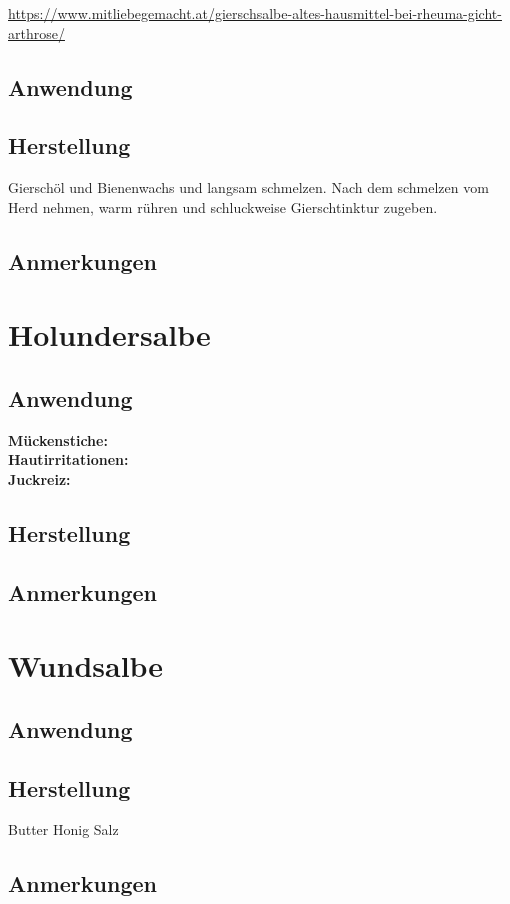 \url{https://www.mitliebegemacht.at/gierschsalbe-altes-hausmittel-bei-rheuma-gicht-arthrose/}

    

\subsection{Anwendung}

\subsection{Herstellung}

Gierschöl und Bienenwachs und langsam schmelzen. Nach dem schmelzen vom Herd nehmen, warm rühren und schluckweise Gierschtinktur zugeben.

\subsection{Anmerkungen}


\newpage


\section{Holundersalbe}

   

\subsection{Anwendung}

\textbf{Mückenstiche:} \\ 

\textbf{Hautirritationen:} \\ 

\textbf{Juckreiz:} \\ 

\subsection{Herstellung}

\subsection{Anmerkungen}


\newpage


\section{Wundsalbe}

 

\subsection{Anwendung}

\subsection{Herstellung}

Butter Honig Salz

\subsection{Anmerkungen}



